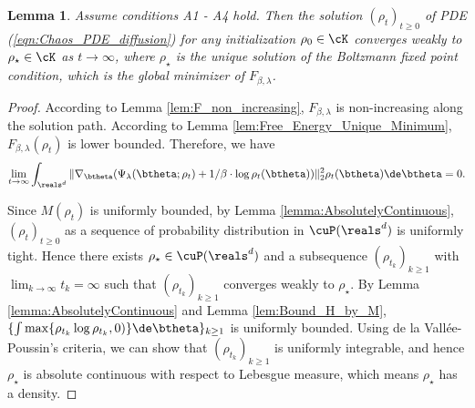 \documentclass[11pt]{article}
\newtheorem{lemma}{Lemma}
\begin{document}
\begin{lemma}\label{lem:limiting_point_Boltzmann_equation}
Assume conditions {\sf A1} - {\sf A4} hold. Then the solution $(\rho_t)_{t\ge 0}$ of PDE (\ref{eqn:Chaos_PDE_diffusion}) for any initialization $\rho_0 \in \cK$ converges weakly to $\rho_\star \in \cK$ as $t \to \infty$, where $\rho_\star$ is the unique solution of  the Boltzmann fixed point condition, which is the global minimizer of $F_{\beta, \lambda}$. 
\end{lemma}

\begin{proof}
According to Lemma \ref{lem:F_non_increasing}, $F_{\beta, \lambda}$ is non-increasing along the solution path. According to Lemma \ref{lem:Free_Energy_Unique_Minimum}, $F_{\beta, \lambda}(\rho_t)$ is lower bounded. Therefore, we have 
\begin{align}\label{eqn:partial_F_converges_to_0}
\lim_{t \to \infty} \int_{\reals^d} \| \nabla_\btheta(\Psi_\lambda(\btheta; \rho_t) + 1/\beta \cdot \log \rho_t(\btheta)) \|_2^2 \rho_t(\btheta) \de \btheta = 0. 
\end{align}

Since $M(\rho_t)$ is uniformly bounded, by Lemma \ref{lemma:AbsolutelyContinuous}, $(\rho_t)_{t\ge 0}$ as a sequence of probability distribution in $\cuP(\reals^d)$ is uniformly tight. Hence there exists $\rho_\star \in \cuP(\reals^d)$ and a subsequence $(\rho_{t_k})_{k \ge 1}$ with $\lim_{k\to\infty} t_k = \infty$ such that $(\rho_{t_k})_{k \ge 1}$ converges weakly to $\rho_\star$. By Lemma \ref{lemma:AbsolutelyContinuous} and Lemma \ref{lem:Bound_H_by_M}, $\{ \int \max\{\rho_{t_k} \log \rho_{t_k}, 0) \} \de \btheta\}_{k \ge 1}$ is uniformly bounded. 
Using de la Vall\'ee-Poussin's criteria, we can show that $(\rho_{t_k})_{k \ge 1}$ is uniformly integrable, and hence $\rho_\star$ is absolute continuous with respect to Lebesgue measure, which means $\rho_\star$ has a density. 


\end{proof}
\end{document}
